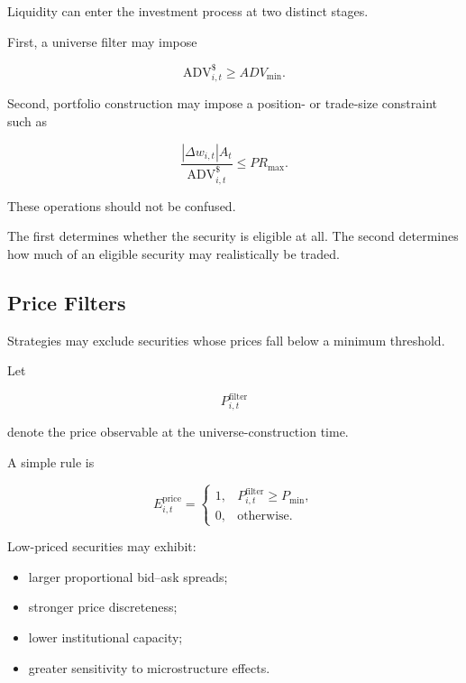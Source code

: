 \documentclass[11pt,a4paper]{article}
\begin{document}
Liquidity can enter the investment process at two distinct stages.

First, a universe filter may impose

\begin{equation}
\mathrm{ADV}_{i,t}^{\$}
\geq
ADV_{\min}.
\end{equation}

Second, portfolio construction may impose a position- or trade-size constraint
such as

\begin{equation}
\frac{
|\Delta w_{i,t}|A_t
}{
\mathrm{ADV}_{i,t}^{\$}
}
\leq
PR_{\max}.
\end{equation}

These operations should not be confused.

The first determines whether the security is eligible at all. The second
determines how much of an eligible security may realistically be traded.


\subsection{Price Filters}
\label{subsec:price_filters}

Strategies may exclude securities whose prices fall below a minimum threshold.

Let

\begin{equation}
P_{i,t}^{\mathrm{filter}}
\end{equation}

denote the price observable at the universe-construction time.

A simple rule is

\begin{equation}
E_{i,t}^{\mathrm{price}}
=
\begin{cases}
1,
&
P_{i,t}^{\mathrm{filter}}
\geq
P_{\min},
\\
0,
&
\text{otherwise}.
\end{cases}
\end{equation}

Low-priced securities may exhibit:

\begin{itemize}
    \item larger proportional bid--ask spreads;
    \item stronger price discreteness;
    \item lower institutional capacity;
    \item greater sensitivity to microstructure effects.
\end{itemize}
\end{document}
